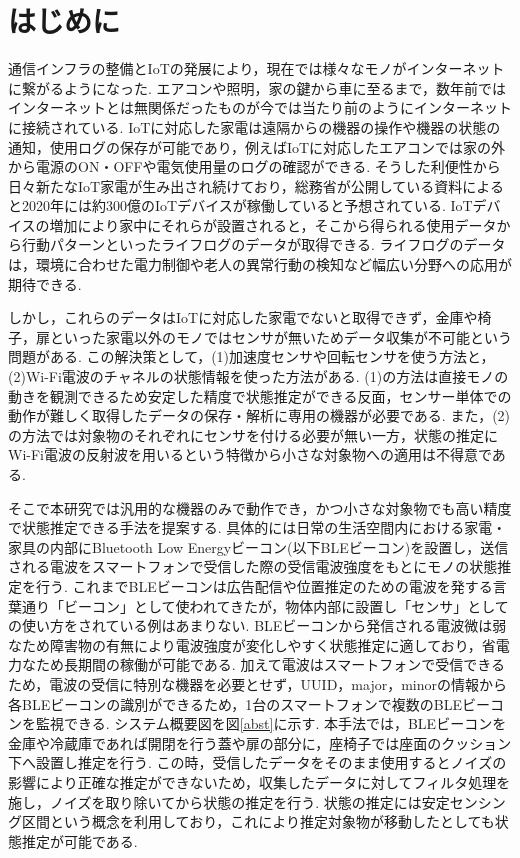 \documentclass[Japanese]{dicomopapers}
\begin{document}
\section{はじめに}
通信インフラの整備とIoTの発展により，現在では様々なモノがインターネットに繋がるようになった.
エアコンや照明，家の鍵から車に至るまで，数年前ではインターネットとは無関係だったものが今では当たり前のようにインターネットに接続されている.
IoTに対応した家電は遠隔からの機器の操作や機器の状態の通知，使用ログの保存が可能であり，例えばIoTに対応したエアコンでは家の外から電源のON・OFFや電気使用量のログの確認ができる.
そうした利便性から日々新たなIoT家電が生み出され続けており，総務省が公開している資料\cite{soumusyo}によると2020年には約300億のIoTデバイスが稼働していると予想されている.
IoTデバイスの増加により家中にそれらが設置されると，そこから得られる使用データから行動パターンといったライフログのデータが取得できる.
ライフログのデータは，環境に合わせた電力制御や老人の異常行動の検知など幅広い分野への応用が期待できる.

しかし，これらのデータはIoTに対応した家電でないと取得できず，金庫や椅子，扉といった家電以外のモノではセンサが無いためデータ収集が不可能という問題がある.
この解決策として，(1)加速度センサや回転センサを使う方法と，(2)Wi-Fi電波のチャネルの状態情報を使った方法がある.
(1)の方法は直接モノの動きを観測できるため安定した精度で状態推定ができる反面，センサー単体での動作が難しく取得したデータの保存・解析に専用の機器が必要である.
また，(2)の方法では対象物のそれぞれにセンサを付ける必要が無い一方，状態の推定にWi-Fi電波の反射波を用いるという特徴から小さな対象物への適用は不得意である.

そこで本研究では汎用的な機器のみで動作でき，かつ小さな対象物でも高い精度で状態推定できる手法を提案する.
具体的には日常の生活空間内における家電・家具の内部にBluetooth Low Energyビーコン(以下BLEビーコン)を設置し，送信される電波をスマートフォンで受信した際の受信電波強度をもとにモノの状態推定を行う.
これまでBLEビーコンは広告配信や位置推定のための電波を発する言葉通り「ビーコン」として使われてきたが，物体内部に設置し「センサ」としての使い方をされている例はあまりない.
BLEビーコンから発信される電波微は弱なため障害物の有無により電波強度が変化しやすく状態推定に適しており，省電力なため長期間の稼働が可能である.
加えて電波はスマートフォンで受信できるため，電波の受信に特別な機器を必要とせず，UUID，major，minorの情報から各BLEビーコンの識別ができるため，1台のスマートフォンで複数のBLEビーコンを監視できる.
システム概要図を図\ref{abst}に示す.
本手法では，BLEビーコンを金庫や冷蔵庫であれば開閉を行う蓋や扉の部分に，座椅子では座面のクッション下へ設置し推定を行う.
この時，受信したデータをそのまま使用するとノイズの影響により正確な推定ができないため，収集したデータに対してフィルタ処理を施し，ノイズを取り除いてから状態の推定を行う.
状態の推定には安定センシング区間という概念を利用しており，これにより推定対象物が移動したとしても状態推定が可能である.
\end{document}
